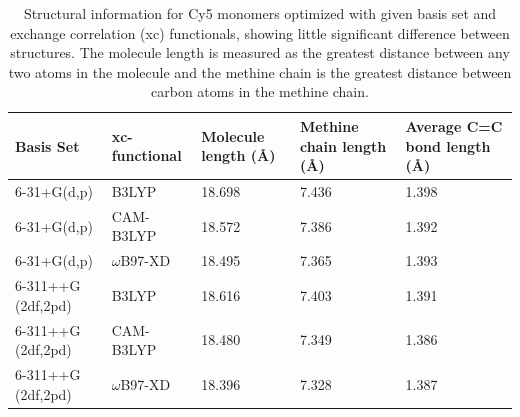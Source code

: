 \begin{table}[h]
\centering
\caption{Structural information for Cy5 monomers optimized with given basis set and exchange correlation (xc) functionals, showing little significant difference between structures. The molecule length is measured as the greatest distance between any two atoms in the molecule and the methine chain is the greatest distance between carbon atoms in the methine chain. } \label{tab:structure}
\begin{tabular}{|p{25mm}|p{25mm}|p{22mm}|p{28mm}|p{30mm}|}
\hline
Basis Set & xc-functional & Molecule \newline length (\AA) & Methine chain \newline length (\AA) & Average C=C \newline bond length (\AA) \\ \hline
6-31+G(d,p) & B3LYP & 18.698 & 7.436 & 1.398 \\ \hline
6-31+G(d,p) & CAM-B3LYP & 18.572 & 7.386 & 1.392 \\ \hline
6-31+G(d,p) & $\omega$B97-XD & 18.495 & 7.365 & 1.393 \\ \hline
6-311++G \newline (2df,2pd) & B3LYP & 18.616 & 7.403 & 1.391 \\ \hline
6-311++G \newline (2df,2pd) & CAM-B3LYP & 18.480 & 7.349 & 1.386 \\ \hline
6-311++G \newline (2df,2pd) & $\omega$B97-XD & 18.396 & 7.328 & 1.387 \\ \hline
\end{tabular}
\end{table}

